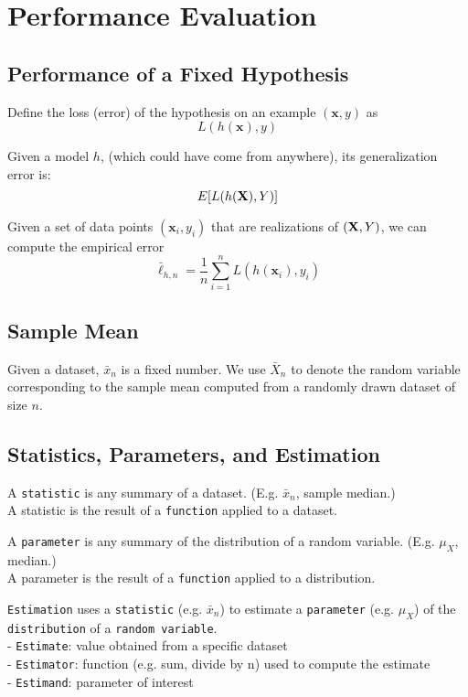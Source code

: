 \documentclass[10pt,landscape,a4paper]{cheatsheet}
\newcommand{\x}{\mathbf{x}}
\begin{document}
  \section{Performance Evaluation}

  \subsection{Performance of a Fixed Hypothesis}
   Define the loss (error) of the hypothesis on an example $(\x, y)$ as
		$$L(h(\x) ,y)$$

  Given a model $h$, (which could have come from anywhere), its
    generalization error is:
    $$E[L(h({{\bf X}}),Y)]$$

  Given a set of data points $(\x_i, y_i)$ that are realizations of $({{\bf X}},Y)$, we can compute the empirical error
    $$\bar\ell_{h,n} = \frac{1}{n}\sum_{i=1}^n L(h({{\x }}_i),y_i)$$

  \subsection{Sample Mean}

  Given a dataset, $\bar x_n$ is a fixed number. We use $\bar X_n$ to denote the random variable corresponding 
  to the sample mean computed from a randomly drawn dataset of size $n$.

  \subsection{Statistics, Parameters, and Estimation}
  A \texttt{statistic} is any summary of a dataset. (E.g. $\bar x_n$, sample median.)\\
  A statistic is the result of a \texttt{function} applied to a dataset.\newline

  A \texttt{parameter} is any summary of the distribution of a random variable. (E.g. $\mu_X$, median.)\\
  A parameter is the result of a \texttt{function} applied to a distribution.\newline

  \texttt{Estimation} uses a \texttt{statistic} (e.g. $\bar{x}_n$) to estimate a \texttt{parameter}
  (e.g. $\mu_X$) of the \texttt{distribution} of a \texttt{random variable}.\\
    - \texttt{Estimate}: value obtained from a specific dataset\\
    - \texttt{Estimator}: function (e.g. sum, divide by n) used to compute the estimate\\
    - \texttt{Estimand}: parameter of interest\newline
\end{document}
